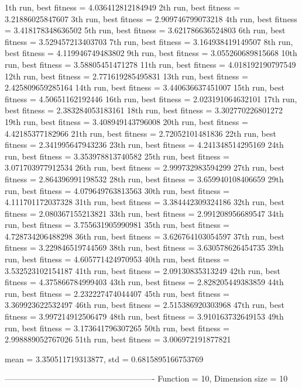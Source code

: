 1th run, best fitness = 4.036412812184949
2th run, best fitness = 3.21886025847607
3th run, best fitness = 2.909746799073218
4th run, best fitness = 3.418178348636502
5th run, best fitness = 3.621786636524803
6th run, best fitness = 3.529457213403703
7th run, best fitness = 3.164938419149507
8th run, best fitness = 4.119946749483802
9th run, best fitness = 3.055260689815668
10th run, best fitness = 3.58805451471278
11th run, best fitness = 4.018192190797549
12th run, best fitness = 2.771619285495831
13th run, best fitness = 2.425809659285164
14th run, best fitness = 3.440636637451007
15th run, best fitness = 4.50651162192446
16th run, best fitness = 2.023191064632101
17th run, best fitness = 2.383284053183161
18th run, best fitness = 3.302770226801272
19th run, best fitness = 3.408949143796008
20th run, best fitness = 4.42185377182966
21th run, best fitness = 2.72052101481836
22th run, best fitness = 2.341995647943236
23th run, best fitness = 4.241348514295169
24th run, best fitness = 3.353978813740582
25th run, best fitness = 3.071703977912534
26th run, best fitness = 2.999732983594299
27th run, best fitness = 2.864396991198532
28th run, best fitness = 3.659940108406659
29th run, best fitness = 4.079649763813563
30th run, best fitness = 4.111701172037328
31th run, best fitness = 3.384442309324186
32th run, best fitness = 2.080367155213821
33th run, best fitness = 2.991208956689547
34th run, best fitness = 3.755631905990981
35th run, best fitness = 4.728734206488298
36th run, best fitness = 3.626764103054597
37th run, best fitness = 3.229846519744569
38th run, best fitness = 3.630578626454735
39th run, best fitness = 4.605771424970953
40th run, best fitness = 3.532523102154187
41th run, best fitness = 2.09130835313249
42th run, best fitness = 4.375866784999403
43th run, best fitness = 2.828205449383859
44th run, best fitness = 2.232227474044407
45th run, best fitness = 3.369923622532497
46th run, best fitness = 2.515386920303968
47th run, best fitness = 3.997214912506479
48th run, best fitness = 3.910163732649153
49th run, best fitness = 3.173641796307265
50th run, best fitness = 2.998889052767026
51th run, best fitness = 3.006972191877821

mean = 3.350511719313877, std = 0.6815895166753769

-------------------------------------------------------
Function = 10, Dimension size = 10

